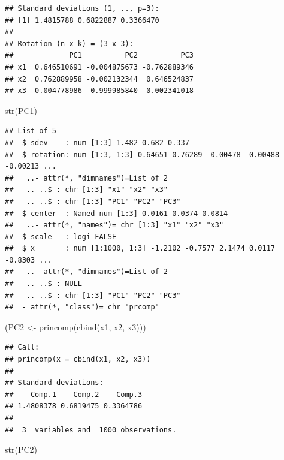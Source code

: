 \documentclass[
  12pt,
]{book}
\newenvironment{Shaded}{\begin{snugshade}}{\end{snugshade}}
\newcommand{\FunctionTok}[1]{\textcolor[rgb]{0.00,0.00,0.00}{#1}}
\newcommand{\NormalTok}[1]{#1}
\newcommand{\OtherTok}[1]{\textcolor[rgb]{0.56,0.35,0.01}{#1}}
\theoremstyle{definition}
\theoremstyle{definition}
\theoremstyle{definition}
\theoremstyle{definition}
\theoremstyle{remark}
\begin{document}
\begin{verbatim}
## Standard deviations (1, .., p=3):
## [1] 1.4815788 0.6822887 0.3366470
## 
## Rotation (n x k) = (3 x 3):
##             PC1          PC2          PC3
## x1  0.646510691 -0.004875673 -0.762889346
## x2  0.762889958 -0.002132344  0.646524837
## x3 -0.004778986 -0.999985840  0.002341018
\end{verbatim}

\begin{Shaded}
\begin{Highlighting}[]
\FunctionTok{str}\NormalTok{(PC1)}
\end{Highlighting}
\end{Shaded}

\begin{verbatim}
## List of 5
##  $ sdev    : num [1:3] 1.482 0.682 0.337
##  $ rotation: num [1:3, 1:3] 0.64651 0.76289 -0.00478 -0.00488 -0.00213 ...
##   ..- attr(*, "dimnames")=List of 2
##   .. ..$ : chr [1:3] "x1" "x2" "x3"
##   .. ..$ : chr [1:3] "PC1" "PC2" "PC3"
##  $ center  : Named num [1:3] 0.0161 0.0374 0.0814
##   ..- attr(*, "names")= chr [1:3] "x1" "x2" "x3"
##  $ scale   : logi FALSE
##  $ x       : num [1:1000, 1:3] -1.2102 -0.7577 2.1474 0.0117 -0.8303 ...
##   ..- attr(*, "dimnames")=List of 2
##   .. ..$ : NULL
##   .. ..$ : chr [1:3] "PC1" "PC2" "PC3"
##  - attr(*, "class")= chr "prcomp"
\end{verbatim}

\begin{Shaded}
\begin{Highlighting}[]
\NormalTok{(PC2 }\OtherTok{\textless{}{-}} \FunctionTok{princomp}\NormalTok{(}\FunctionTok{cbind}\NormalTok{(x1, x2, x3)))}
\end{Highlighting}
\end{Shaded}

\begin{verbatim}
## Call:
## princomp(x = cbind(x1, x2, x3))
## 
## Standard deviations:
##    Comp.1    Comp.2    Comp.3 
## 1.4808378 0.6819475 0.3364786 
## 
##  3  variables and  1000 observations.
\end{verbatim}

\begin{Shaded}
\begin{Highlighting}[]
\FunctionTok{str}\NormalTok{(PC2)}
\end{Highlighting}
\end{Shaded}
\end{document}
